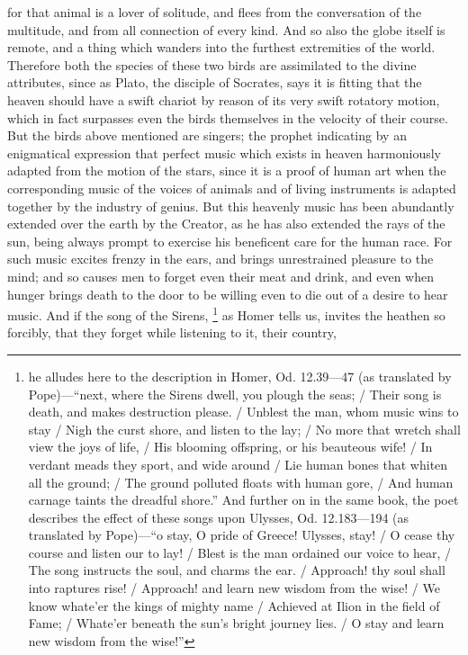 for that animal is a lover of solitude, and flees from the conversation of the multitude, and from all
connection of every kind. And so also the globe itself is remote, and a thing which wanders into the
furthest extremities of the world. Therefore both the species of these two birds are assimilated to
the divine attributes, since as Plato, the disciple of Socrates, says it is fitting that the heaven
should have a swift chariot by reason of its very swift rotatory motion, which in fact surpasses
even the birds themselves in the velocity of their course. But the birds above mentioned are
singers; the prophet indicating by an enigmatical expression that perfect music which exists in
heaven harmoniously adapted from the motion of the stars, since it is a proof of human art when
the corresponding music of the voices of animals and of living instruments is adapted together by
the industry of genius. But this heavenly music has been abundantly extended over the earth by the
Creator, as he has also extended the rays of the sun, being always prompt to exercise his
beneficent care for the human race. For such music excites frenzy in the ears, and brings
unrestrained pleasure to the mind; and so causes men to forget even their meat and drink, and
even when hunger brings death to the door to be willing even to die out of a desire to hear music.
And if the song of the Sirens, \footnote{he alludes here to the description in Homer, Od. 12.39—47 (as translated by
Pope)—``next, where the Sirens dwell, you plough the seas; / Their song is death, and makes destruction please. / Unblest
the man, whom music wins to stay / Nigh the curst shore, and listen to the lay; / No more that wretch shall view the joys of
life, / His blooming offspring, or his beauteous wife! / In verdant meads they sport, and wide around / Lie human bones
that whiten all the ground; / The ground polluted floats with human gore, / And human carnage taints the dreadful shore.''
And further on in the same book, the poet describes the effect of these songs upon Ulysses, Od. 12.183—194 (as translated
by Pope)—``o stay, O pride of Greece! Ulysses, stay! / O cease thy course and listen our to lay! / Blest is the man ordained
our voice to hear, / The song instructs the soul, and charms the ear. / Approach! thy soul shall into raptures rise! /
Approach! and learn new wisdom from the wise! / We know whate'er the kings of mighty name / Achieved at Ilion in the
field of Fame; / Whate'er beneath the sun's bright journey lies. / O stay and learn new wisdom from the wise!''} as
Homer tells us, invites the heathen so forcibly, that they forget while listening to it, their country,
